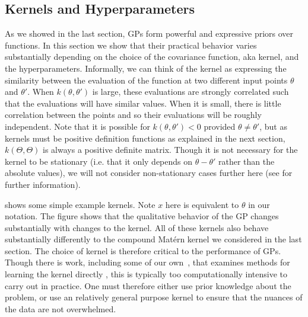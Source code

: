 \subsection{Kernels and Hyperparameters}
\label{sec:opt:gps:kernels}

As we showed in the last section, GPs form powerful and expressive priors over functions.
In this section we show that their practical behavior varies substantially depending on the
choice of the covariance function, aka kernel, and the hyperparameters.   Informally, we can think
of the kernel as expressing the similarity between the evaluation of the function at two different input
points $\theta$ and $\theta'$.  When $k(\theta,\theta')$ is large, these evaluations are strongly
correlated such that the evaluations will have similar values.  When it is small, there is little
correlation between the points and so their evaluations will be roughly independent.  Note that
it is possible for $k(\theta,\theta')<0$ provided $\theta\neq\theta'$, but as kernels must
be positive definition functions as explained in the next section, $k\left(\Theta,\Theta\right)$ is
always a positive definite matrix.  Though it is not necessary for the kernel to be stationary (i.e.
that it only depends on $\theta-\theta'$ rather than the absolute values), we will not
consider non-stationary cases further here (see \cite{rasmussen2006gaussian} for further
information).
%

\cite[Figure 2.1]{duvenaud2014automatic} shows
some simple example kernels.  Note $x$ here is equivalent to $\theta$ in our
notation.  The figure shows that the qualitative behavior of the GP changes
substantially with changes to the kernel.  All of these kernels also behave
substantially differently to the compound Mat\'{e}rn kernel we considered in the last section.
The choice of kernel is therefore
critical to the performance of GPs.  Though there is work, including some of
our own~\citep{janz2016probstruct}, that examines methods 
for learning the kernel directly
\citep{duvenaud2013structure,lloyd2014automatic,wilson2014fast}, 
this is typically too computationally intensive
to carry out in practice.  One must therefore either use prior knowledge about the
problem, or use an relatively general purpose kernel to ensure that the nuances of the
data are not overwhelmed.

